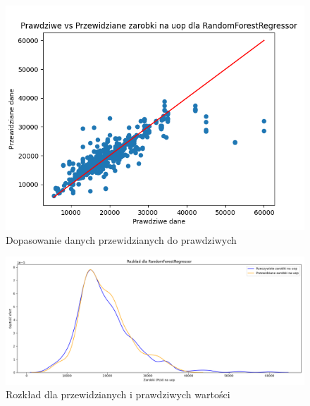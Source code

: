 \documentclass[a4paper]{article}
\begin{document}
\begin{figure}[H]
    \centering
    \includegraphics[width=\textwidth]{../analysis/plots/wyniki/0.6&0.4/uop/RandomForestRegressor/scatter.png}
    \caption{Dopasowanie danych przewidzianych do prawdziwych}
\end{figure}

\begin{figure}[H]
    \centering
    \includegraphics[width=\textwidth]{../analysis/plots/wyniki/0.6&0.4/uop/RandomForestRegressor/salary_dist.png}
    \caption{Rozkład dla przewidzianych i prawdziwych wartości}
\end{figure}
\end{document}
